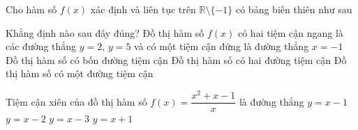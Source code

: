 \begin{ex}%
	Cho hàm số $f(x)$ xác định và liên tục trên $\mathbb{R}\setminus \{-1\}$  có bảng biến thiên như sau
	\begin{center}
	\end{center}
	Khẳng định nào sau đây đúng? 
	 \choice
		{\True Đồ thị hàm số $f(x)$ có hai tiệm cận ngang  là các đường thẳng $y=2$, $y=5$ và có một tiệm cận đứng là đường thẳng $x=-1$}
		{Đồ  thị hàm số có bốn đường tiệm cận}
		{Đồ thị hàm số có  hai đường tiệm cận}
		{Đồ thị hàm số có một  đường tiệm cận}
\end{ex}

\begin{ex}%
	Tiệm cận xiên của đồ thị hàm số $f(x)  = \dfrac{x^2+x-1}{x}$ là đường thẳng
	\choice 
		 {$y=x-1$}
		 {$y=x-2$}
		{$y=x-3$} 
		 {\True$y=x+1$}
\end{ex}

